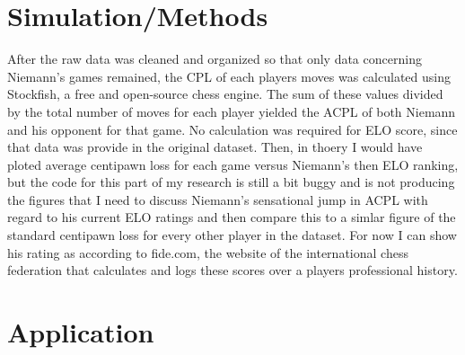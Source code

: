 \documentclass[12pt, letterpaper, titlepage]{article}
\begin{document}
\section*{Simulation/Methods}
\label{sec:sim}


After the raw data was cleaned and organized so that only data concerning Niemann's games remained, the CPL of each players moves was calculated using Stockfish, a free and open-source chess engine. The sum of these values divided by the total number of moves for each player yielded the ACPL of both Niemann and his opponent for that game. No calculation was required for ELO score, since that data was provide in the original dataset. Then, in thoery I would have ploted average centipawn loss for each game versus Niemann's then ELO ranking, but the code for this part of my research is still a bit buggy and is not producing the figures that I need to discuss Niemann's sensational jump in ACPL with regard to his current ELO ratings and then compare this to a simlar figure of the standard centipawn loss for every other player in the dataset. For now I can show his rating as according to fide.com, the website of the international chess federation that calculates and logs these scores over a players professional history.

\section*{Application}
\label{sec:app}
\end{document}
